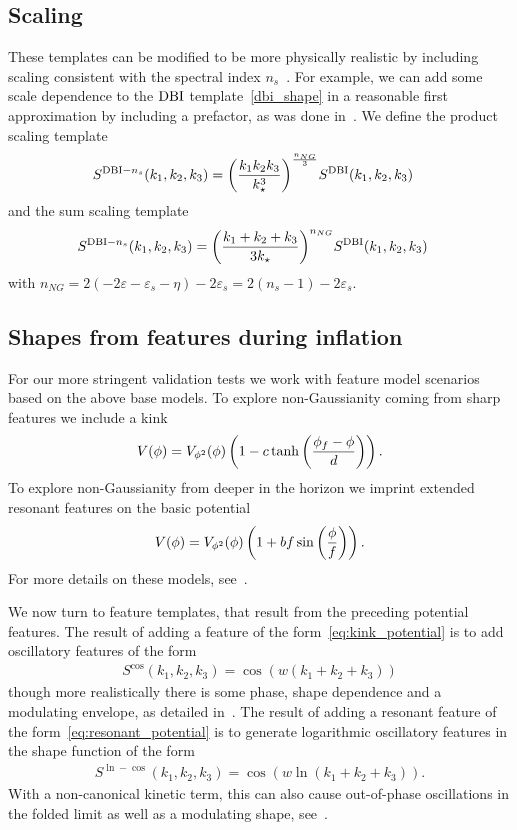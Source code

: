     \subsection{Scaling}
These templates can be modified to be more physically realistic by including
scaling consistent with the spectral index $n_s$~\cite{Planck_NG_2015}.
For example, we can add some scale dependence to the $\text{DBI}$ template~\eqref{dbi_shape}
in a reasonable first approximation by including a prefactor,
as was done in~\cite{Planck_NG_2013}.
We define the product scaling template
\begin{align}\label{dbi_prod_shape}
    S^{\text{DBI}-n_s}(k_1,k_2,k_3) &= {\left(\frac{k_1k_2k_3}{k^3_\star}\right)}^{\frac{n_{NG}}{3}}S^{\text{DBI}}(k_1,k_2,k_3)
\end{align}
and the sum scaling template
\begin{align}\label{dbi_sum_shape}
    S^{\text{DBI}-n_s}(k_1,k_2,k_3) &= {\left(\frac{k_1+k_2+k_3}{3k_\star}\right)}^{n_{NG}}S^{\text{DBI}}(k_1,k_2,k_3)
\end{align}
with $n_{NG}=2(-2\varepsilon-\varepsilon_s-\eta)-2\varepsilon_s=2(n_s-1)-2\varepsilon_s$.


\subsection{Shapes from features during inflation}
For our more stringent validation tests we work with feature model scenarios
based on the above base models.
To explore non-Gaussianity coming from sharp features we include
a kink~\cite{Adams_step}
\begin{align}\label{eq:kink_potential}
    V(\phi) = V_{\phi^2}(\phi)\left(1-c\tanh\left(\frac{\phi_f-\phi}{d}\right)\right).
\end{align}
To explore non-Gaussianity from deeper in the horizon we imprint
extended resonant features on the basic potential
\begin{align}\label{eq:resonant_potential}
    V(\phi) = V_{\phi^2}(\phi)\left(1+bf\sin\left(\frac{\phi}{f}\right)\right).
\end{align}
For more details on these models, see~\cite{chen_easther_lim_2}.


We now turn to feature templates, that result from the preceding potential features.
The result of adding a feature of the form~\eqref{eq:kink_potential}
is to add oscillatory features of the form
\begin{align}\label{cos_shape}
    S^{\cos}(k_1,k_2,k_3) = \cos(w(k_1+k_2+k_3))
\end{align}
though more realistically there is some phase, shape dependence and a modulating envelope,
as detailed in~\cite{adshead}.
The result of adding a resonant feature of the form~\eqref{eq:resonant_potential}
is to generate logarithmic oscillatory features in the shape function of the form
\begin{align}\label{ln_cos_shape}
    S^{\ln-\cos}(k_1,k_2,k_3) = \cos(w\ln(k_1+k_2+k_3)).
\end{align}
With a non-canonical kinetic term, this can also
cause out-of-phase oscillations in the folded limit as well as a modulating shape,
see~\cite{chen_folded_resonant}.



